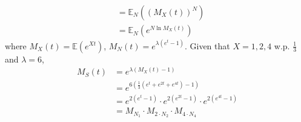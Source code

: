 \documentclass[a4paper]{article}
\newcommand{\Avg}{\mathbb{E}}
\newcommand{\E}{\Avg}
\begin{document}
{\begin{align*}
        &=\E_N((M_X(t))^N) \\
        &=\E_N(e^{N\ln M_X(t)})
    \end{align*}
    where $M_X(t)=\E(e^{Xt})$, $M_N(t)=e^{\lambda(e^t-1)}$. Given that $X=1,2,4$ w.p. $\frac{1}{3}$ and $\lambda=6$,
    \begin{align*}
        M_S(t)&=e^{\lambda(M_X(t)-1)} \\
        &=e^{6\left(\frac{1}{3}(e^t+e^{2t}+e^{4t})-1\right)} \\
        &=e^{2(e^t-1)}\cdot e^{2(e^{2t}-1)}\cdot e^{2(e^{4t}-1)} \\
        &=M_{N_1}\cdot M_{2\cdot N_2} \cdot M_{4\cdot N_4}
    \end{align*}
}
\end{document}
